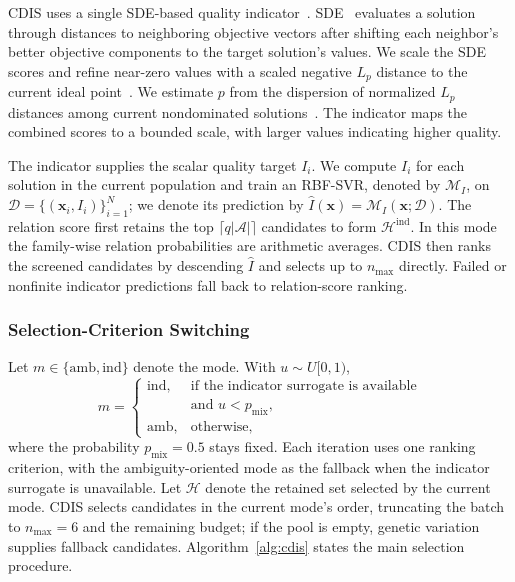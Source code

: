 \documentclass[final,5p,times,twocolumn]{elsarticle}
\newcommand{\vx}{\mathbf{x}}
\begin{document}
CDIS uses a single SDE-based quality indicator~\cite{ref:sde,ref:piea}.
SDE~\cite{ref:sde} evaluates a solution
through distances to neighboring objective vectors after shifting each
neighbor's better objective components to the target solution's values.
We scale the SDE scores and refine near-zero values with a scaled negative
$L_p$ distance to the current ideal point~\cite{ref:piea}.
We estimate $p$ from the dispersion of normalized $L_p$ distances among
current nondominated solutions~\cite{ref:tworea,ref:piea}.
The indicator maps the combined scores to a bounded scale, with larger
values indicating higher quality.

The indicator supplies the scalar quality target $I_i$.
We compute $I_i$ for each solution in the
current population and train an
RBF-SVR, denoted by $\mathcal{M}_I$, on
$\mathcal{D}=\{(\vx_i,I_i)\}_{i=1}^{N}$; we denote its prediction by
$\widehat I(\vx)=\mathcal{M}_I(\vx;\mathcal{D})$.
The relation score first retains the top
$\lceil q|\mathcal{A}|\rceil$ candidates to form $\mathcal{H}^{\mathrm{ind}}$.
In this mode the family-wise relation probabilities are arithmetic averages.
CDIS then ranks the screened candidates by descending $\widehat I$ and
selects up to $n_{\max}$ directly. Failed or nonfinite indicator predictions
fall back to relation-score ranking.

\subsubsection{Selection-Criterion Switching}
\label{sec:method:cdis:mix}

Let $m\in\{\mathrm{amb},\mathrm{ind}\}$ denote the mode. With $u\sim U[0,1)$,
\begin{equation}
m=\begin{cases}
\mathrm{ind}, & \text{if the indicator surrogate is available}\\
              & \text{and }u<p_{\mathrm{mix}},\\[2pt]
\mathrm{amb}, & \text{otherwise},
\end{cases}
\label{eq:mode}
\end{equation}
where the probability $p_{\mathrm{mix}}=0.5$ stays fixed. Each iteration uses one ranking
criterion, with the ambiguity-oriented mode as the fallback when the indicator
surrogate is unavailable. Let $\mathcal{H}$ denote the retained set selected by
the current mode. CDIS selects candidates in the current mode's order,
truncating the batch to $n_{\max}=6$ and the remaining budget; if the pool is
empty, genetic variation supplies fallback candidates.
Algorithm~\ref{alg:cdis} states the main selection procedure.
\end{document}

